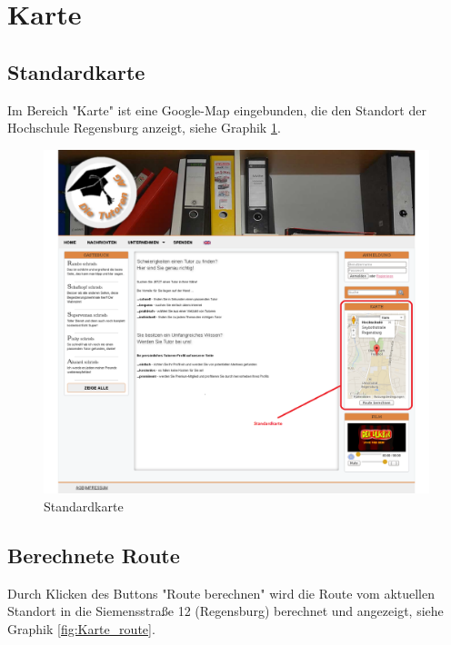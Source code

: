 
\section{Karte}

\subsection{Standardkarte}

Im Bereich "Karte" ist eine Google-Map eingebunden, die den Standort der Hochschule Regensburg anzeigt, siehe Graphik \ref{fig:Karte}.

\begin{figure}[!htbp]
 \centering
 \includegraphics[width=1\textwidth]{../Screenshots/Karte}
 \caption{Standardkarte}
 \label{fig:Karte}
\end{figure}

\newpage

\subsection{Berechnete Route}

Durch Klicken des Buttons "Route berechnen" wird die Route vom aktuellen Standort in die Siemensstraße 12 (Regensburg) berechnet und angezeigt, siehe Graphik \ref{fig:Karte_route}.

